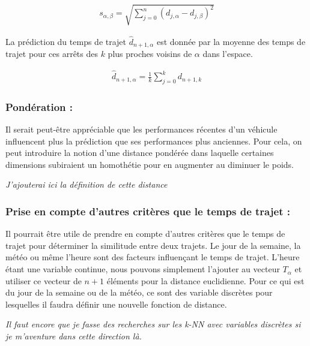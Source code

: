 \documentclass[letterpaper]{article}
\begin{document}
\begin{eqnarray}
s_{\alpha,\beta} = \sqrt{\sum_{j=0}^{n}(d_{j,\alpha} - d_{j,\beta})^2}
\end{eqnarray}

La prédiction du temps de trajet $\hat{d}_{n+1,\alpha}$ est donnée par la moyenne des temps de trajet pour ces arrêts des $k$ plus proches voisins de $\alpha$ dans l'espace.

\begin{eqnarray}
\hat{d}_{n+1,\alpha} = \frac{1}{k} \sum_{j=0}^{k}d_{n+1,k}
\end{eqnarray}

\subsubsection{Pondération :}
Il serait peut-être appréciable que les performances récentes d'un véhicule influencent plus la prédiction que ses performances plus anciennes. Pour cela, on peut introduire la notion d'une distance pondérée dans laquelle certaines dimensions subiraient un homothétie pour en augmenter au diminuer le poids.

\textit{J'ajouterai ici la définition de cette distance}

\subsubsection{Prise en compte d'autres critères que le temps de trajet :}
Il pourrait être utile de prendre en compte d'autres critères que le temps de trajet pour déterminer la similitude entre deux trajets.
Le jour de la semaine, la météo ou même l'heure sont des facteurs influençant le temps de trajet.
L'heure étant une variable continue, nous pouvons simplement l'ajouter au vecteur $T_{\alpha}$ et utiliser ce vecteur de $n+1$ éléments pour la distance euclidienne. Pour ce qui est du jour de la semaine ou de la météo, ce sont des variable discrètes pour lesquelles il faudra définir une nouvelle fonction de distance.

\textit{Il faut encore que je fasse des recherches sur les k-NN avec variables discrètes si je m'aventure dans cette direction là.}

\footnotesize


\end{document}
